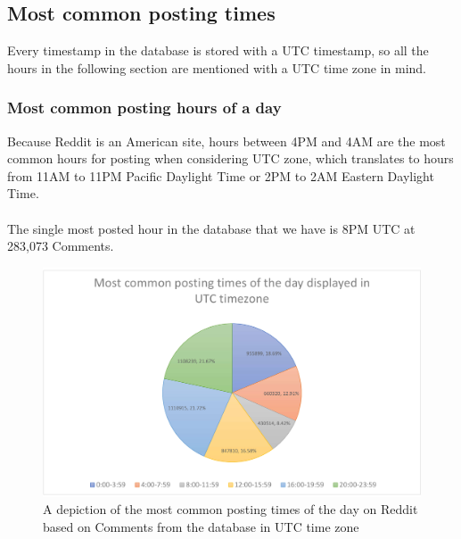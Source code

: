 \documentclass[openany]{article}
\begin{document}
\subsection{Most common posting times}
Every timestamp in the database is stored with a UTC timestamp, so all the hours in the following section are mentioned with a UTC time zone in mind.
\subsubsection{Most common posting hours of a day}
Because Reddit is an American site, hours between 4PM and 4AM are the most common hours for posting when considering UTC zone, which translates to hours from 11AM to 11PM Pacific Daylight Time or 2PM to 2AM Eastern Daylight Time.\\ \\
The single most posted hour in the database that we have is 8PM UTC at 283,073 Comments.
\begin{figure}[H]
    \centering
    \includegraphics[width=\textwidth]{postingtimes.pdf}
    \caption{A depiction of the most common posting times of the day on Reddit based on Comments from the database in UTC time zone}
    \label{fig:mesh1}
\end{figure}
\end{document}
